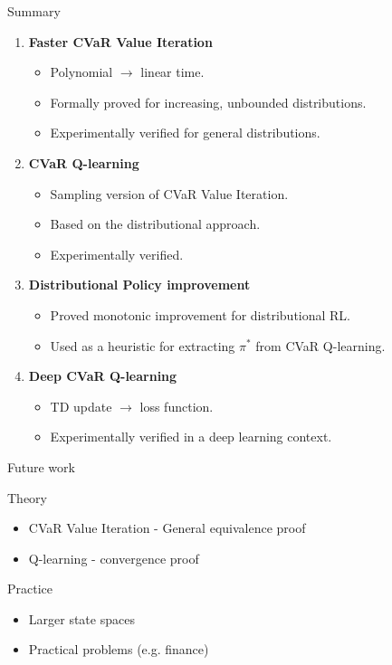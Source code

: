 \documentclass{beamer}
\begin{document}
\begin{frame}{Summary}
\begin{enumerate}
\item \textbf{Faster CVaR Value Iteration} 
\begin{itemize}
\item Polynomial $\to$ linear time.
\item Formally proved for increasing, unbounded distributions.
\item Experimentally verified for general distributions.
\end{itemize}
\item \textbf{CVaR Q-learning} 
\begin{itemize}
\item Sampling version of CVaR Value Iteration.
\item Based on the distributional approach.
\item Experimentally verified.
\end{itemize}
\item \textbf{Distributional Policy improvement}
\begin{itemize}
\item Proved monotonic improvement for distributional RL.
\item Used as a heuristic for extracting $\pi^*$ from CVaR Q-learning.
\end{itemize}
\item \textbf{Deep CVaR Q-learning}
\begin{itemize}
\item TD update $\to$ loss function.
\item Experimentally verified in a deep learning context.
\end{itemize}
\end{enumerate}
\end{frame}



\begin{frame}{Future work}
\begin{block}{Theory}
\begin{itemize}
\item CVaR Value Iteration - General equivalence proof
\item Q-learning - convergence proof
\end{itemize}
\end{block}

\begin{block}{Practice}
\begin{itemize}
\item Larger state spaces
\item Practical problems (e.g. finance)
\end{itemize}
\end{block}
\end{frame}
\end{document}
